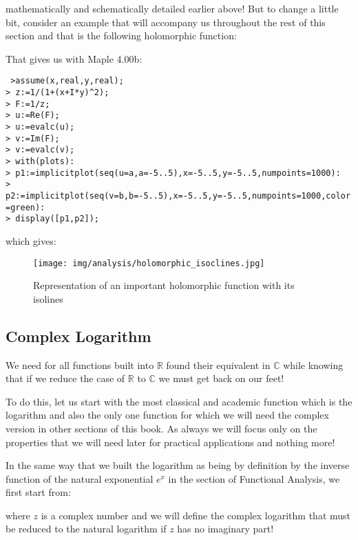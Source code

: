 	mathematically and schematically detailed earlier above! But to change a little bit, consider an example that will accompany us throughout the rest of this section and that is the following holomorphic function:
	
	That gives us with Maple 4.00b:
	
	\texttt{
	>assume(x,real,y,real);\\
	> z:=1/(1+(x+I*y)\string^2);\\
	> F:=1/z;\\
	> u:=Re(F);\\
	> u:=evalc(u);\\
	> v:=Im(F);\\
	> v:=evalc(v);\\
	> with(plots):\\
	> p1:=implicitplot({seq(u=a,a=-5..5)},x=-5..5,y=-5..5,numpoints=1000):\\
	> p2:=implicitplot({seq(v=b,b=-5..5)},x=-5..5,y=-5..5,numpoints=1000,color=green):\\
	> display([p1,p2]);
	}
	
	which gives:
	\begin{figure}[H]
		\begin{center}
			\texttt{[image: img/analysis/holomorphic\_isoclines.jpg]}
		\end{center}	
		\caption{Representation of an important holomorphic function with its isolines}
	\end{figure}
	
	\subsection{Complex Logarithm}
	We need for all functions built into $\mathbb{R}$ found their equivalent in $\mathbb{C}$ while knowing that if we reduce the case of $\mathbb{R}$ to $\mathbb{C}$ we must get back on our feet!
	
	To do this, let us start with the most classical and academic function which is the logarithm and also the only one function for which we will need the complex version in other sections of this book. As always we will focus only on the properties that we will need later for practical applications and nothing more!
	
	In the same way that we built the logarithm as being by definition by the inverse function of the natural exponential $e^x$ in the section of Functional Analysis, we first start from:
	
	where $z$ is a complex number and we will define the complex logarithm that must be reduced to the natural logarithm if $z$ has no imaginary part!
	
